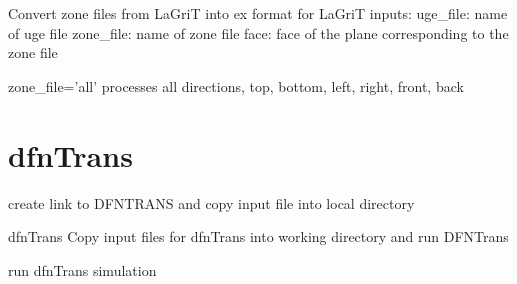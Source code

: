 \documentclass[letterpaper,10pt,english]{sphinxmanual}
\begin{document}

\begin{fulllineitems}
\label{\detokenize{pydfnworks:pydfnworks.flow.zone2ex}}
Convert zone files from LaGriT into ex format for LaGriT
inputs:
uge\_file: name of uge file
zone\_file: name of zone file
face: face of the plane corresponding to the zone file

zone\_file='all' processes all directions, top, bottom, left, right, front, back

\end{fulllineitems}



\section{dfnTrans}
\label{\detokenize{pydfnworks:module-pydfnworks.transport}}\label{\detokenize{pydfnworks:dfntrans}}

\begin{fulllineitems}
\label{\detokenize{pydfnworks:pydfnworks.transport.copy_dfn_trans_files}}
create link to DFNTRANS and copy input file into local directory

\end{fulllineitems}


\begin{fulllineitems}
\label{\detokenize{pydfnworks:pydfnworks.transport.dfn_trans}}
dfnTrans
Copy input files for dfnTrans into working directory and run DFNTrans

\end{fulllineitems}


\begin{fulllineitems}
\label{\detokenize{pydfnworks:pydfnworks.transport.run_dfn_trans}}
run dfnTrans simulation

\end{fulllineitems}
\end{document}
